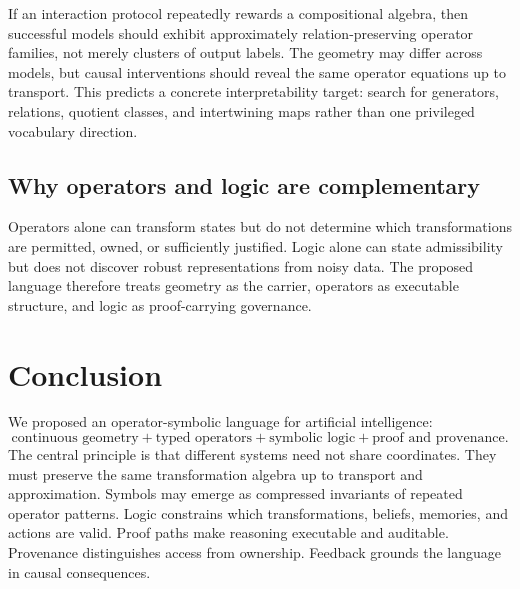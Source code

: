 \documentclass[11pt]{article}
\theoremstyle{definition}
\theoremstyle{remark}
\begin{document}
If an interaction protocol repeatedly rewards a compositional algebra, then successful models should exhibit approximately relation-preserving operator families, not merely clusters of output labels. The geometry may differ across models, but causal interventions should reveal the same operator equations up to transport. This predicts a concrete interpretability target: search for generators, relations, quotient classes, and intertwining maps rather than one privileged vocabulary direction.

\subsection{Why operators and logic are complementary}

Operators alone can transform states but do not determine which transformations are permitted, owned, or sufficiently justified. Logic alone can state admissibility but does not discover robust representations from noisy data. The proposed language therefore treats geometry as the carrier, operators as executable structure, and logic as proof-carrying governance.

\section{Conclusion}

We proposed an operator-symbolic language for artificial intelligence:
\[
\boxed{
\text{continuous geometry}
+
\text{typed operators}
+
\text{symbolic logic}
+
\text{proof and provenance}.
}
\]
The central principle is that different systems need not share coordinates. They must preserve the same transformation algebra up to transport and approximation. Symbols may emerge as compressed invariants of repeated operator patterns. Logic constrains which transformations, beliefs, memories, and actions are valid. Proof paths make reasoning executable and auditable. Provenance distinguishes access from ownership. Feedback grounds the language in causal consequences.
\end{document}
